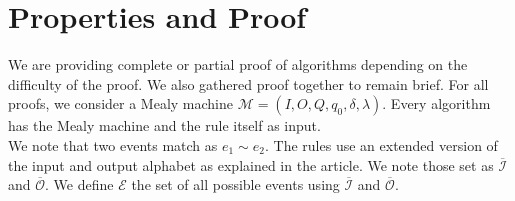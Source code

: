 



\section{Properties and Proof}
We are providing complete or partial proof of algorithms depending on the difficulty of the proof.
We also gathered proof together to remain brief.
For all proofs, we consider a Mealy machine $\mathcal{M}=(I,O,Q,q_0 , \delta,\lambda)$. Every algorithm has the Mealy machine and the rule itself as input.\\
We note that two events match as $e_1\sim e_2$.
The rules use an extended version of the input and output alphabet as explained in the article.
We note those set as $\overline{\mathcal{I}}$ and $\overline{\mathcal{O}}$.
We define $\mathcal{E}$ the set of all possible events using $\overline{\mathcal{I}}$ and $\overline{\mathcal{O}}$.

